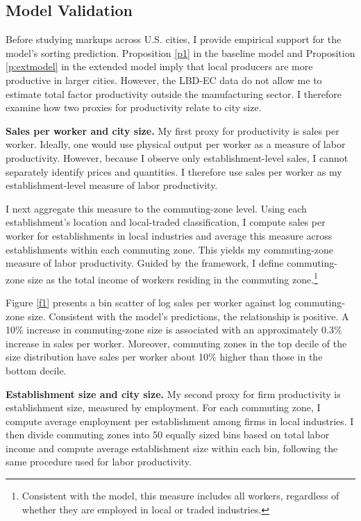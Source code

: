 \subsection{Model Validation}\label{s:modelval}
Before studying markups across U.S. cities, I provide empirical support for the model’s sorting prediction. Proposition \ref{p1} in the baseline model and Proposition \ref{p:extmodel} in the extended model imply that local producers are more productive in larger cities. However, the LBD-EC data do not allow me to estimate total factor productivity outside the manufacturing sector. I therefore examine how two proxies for productivity relate to city size.

\textbf{Sales per worker and city size.} My first proxy for productivity is sales per worker. Ideally, one would use physical output per worker as a measure of labor productivity. However, because I observe only establishment-level sales, I cannot separately identify prices and quantities. I therefore use sales per worker as my establishment-level measure of labor productivity.

I next aggregate this measure to the commuting-zone level. Using each establishment’s location and local-traded classification, I compute sales per worker for establishments in local industries and average this measure across establishments within each commuting zone. This yields my commuting-zone measure of labor productivity. Guided by the framework, I define commuting-zone size as the total income of workers residing in the commuting zone.\footnote{Consistent with the model, this measure includes all workers, regardless of whether they are employed in local or traded industries.}

Figure \ref{f1} presents a bin scatter of log sales per worker against log commuting-zone size. Consistent with the model’s predictions, the relationship is positive. A 10\% increase in commuting-zone size is associated with an approximately 0.3\% increase in sales per worker. Moreover, commuting zones in the top decile of the size distribution have sales per worker about 10\% higher than those in the bottom decile.

\textbf{Establishment size and city size.} My second proxy for firm productivity is establishment size, measured by employment. For each commuting zone, I compute average employment per establishment among firms in local industries. I then divide commuting zones into 50 equally sized bins based on total labor income and compute average establishment size within each bin, following the same procedure used for labor productivity.

